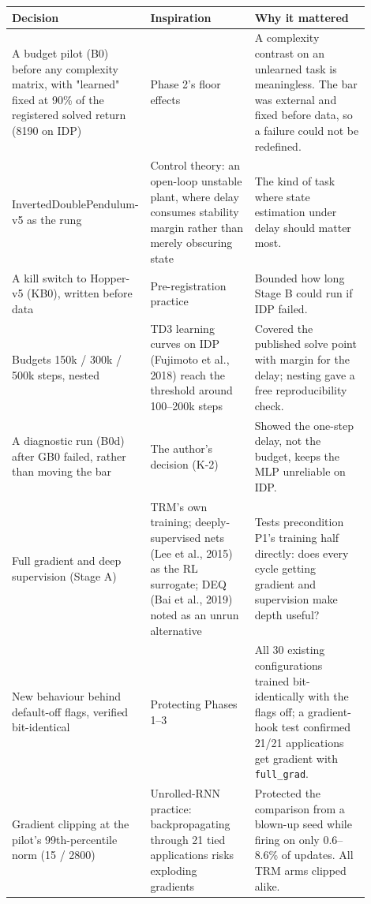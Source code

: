\documentclass[11pt]{article}
\begin{document}
\begin{center}\small\begin{tabular}{>{\raggedright\arraybackslash}p{0.287\linewidth}>{\raggedright\arraybackslash}p{0.291\linewidth}>{\raggedright\arraybackslash}p{0.327\linewidth}}
\toprule
Decision & Inspiration & Why it mattered \\
\midrule
A budget pilot (B0) before any complexity matrix, with "learned" fixed at 90\% of the registered solved return (8190 on IDP) & Phase 2's floor effects & A complexity contrast on an unlearned task is meaningless. The bar was external and fixed before data, so a failure could not be redefined. \\
InvertedDoublePendulum-v5 as the rung & Control theory: an open-loop unstable plant, where delay consumes stability margin rather than merely obscuring state & The kind of task where state estimation under delay should matter most. \\
A kill switch to Hopper-v5 (KB0), written before data & Pre-registration practice & Bounded how long Stage B could run if IDP failed. \\
Budgets 150k / 300k / 500k steps, nested & TD3 learning curves on IDP (Fujimoto et al., 2018) reach the threshold around 100--200k steps & Covered the published solve point with margin for the delay; nesting gave a free reproducibility check. \\
A diagnostic run (B0d) after GB0 failed, rather than moving the bar & The author's decision (K-2) & Showed the one-step delay, not the budget, keeps the MLP unreliable on IDP. \\
Full gradient and deep supervision (Stage A) & TRM's own training; deeply-supervised nets (Lee et al., 2015) as the RL surrogate; DEQ (Bai et al., 2019) noted as an unrun alternative & Tests precondition P1's training half directly: does every cycle getting gradient and supervision make depth useful? \\
New behaviour behind default-off flags, verified bit-identical & Protecting Phases 1--3 & All 30 existing configurations trained bit-identically with the flags off; a gradient-hook test confirmed 21/21 applications get gradient with \texttt{full\_grad}. \\
Gradient clipping at the pilot's 99th-percentile norm (15 / 2800) & Unrolled-RNN practice: backpropagating through 21 tied applications risks exploding gradients & Protected the comparison from a blown-up seed while firing on only 0.6--8.6\% of updates. All TRM arms clipped alike. \\

\end{tabular}
\end{center}
\end{document}
